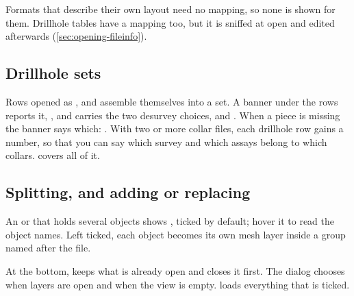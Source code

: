 Formats that describe their own layout need no mapping, so none is shown for them. Drillhole tables have a mapping too, but it is sniffed at open and edited afterwards (\cref{sec:opening-fileinfo}).

\subsection{Drillhole sets}

Rows opened as ,  and  assemble themselves into a set. A banner under the rows reports it, , and carries the two desurvey choices,  and . When a piece is missing the banner says which: . With two or more collar files, each drillhole row gains a  number, so that you can say which survey and which assays belong to which collars.  covers all of it.

\subsection{Splitting, and adding or replacing}

An  or  that holds several objects shows , ticked by default; hover it to read the object names. Left ticked, each object becomes its own mesh layer inside a group named after the file.

At the bottom,  keeps what is already open and  closes it first. The dialog chooses  when layers are open and  when the view is empty.  loads everything that is ticked.


